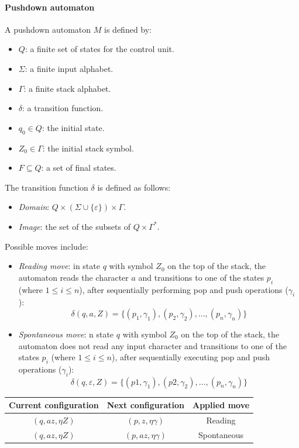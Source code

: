 \paragraph*{Pushdown automaton}
A pushdown automaton $M$ is defined by:
\begin{itemize}
    \item $Q$: a finite set of states for the control unit.
    \item $\Sigma$: a finite input alphabet.
    \item $\Gamma$: a finite stack alphabet.
    \item $\delta$: a transition function.
    \item $q_0 \in Q$: the initial state.
    \item $Z_0 \in \Gamma$: the initial stack symbol.
    \item $F \subseteq Q$: a set of final states.
\end{itemize}
The transition function $\delta$ is defined as follows:
\begin{itemize}
    \item \textit{Domain}: $Q \times \left(\Sigma \cup \{\varepsilon\}\right) \times \Gamma$. 
    \item \textit{Image}: the set of the subsets of $Q \times \Gamma^{*}$. 
\end{itemize}
Possible moves include:
\begin{itemize}
    \item \textit{Reading move}: in state $q$ with symbol $Z_0$ on the top of the stack, the automaton reads the character $a$ and transitions to one of the states $p_i$ (where $1 \leq i \leq n$), after sequentially performing pop and push operations ($\gamma_i$): 
        \[\delta(q,a,Z)=\{(p_1,\gamma_1), (p_2,\gamma_2),\dots,(p_n,\gamma_n)\}\]
    \item \textit{Spontaneous move}: n state $q$ with symbol $Z_0$ on the top of the stack, the automaton does not read any input character and transitions to one of the states $p_i$ (where $1 \leq i \leq n$), after sequentially executing pop and push operations ($\gamma_i$):
        \[\delta(q,\varepsilon,Z)=\{(p1,\gamma_1), (p2,\gamma_2),\dots,(p_n,\gamma_n)\}\]
\end{itemize}
\begin{table}[H]
    \centering
    \begin{tabular}{ccc}
    \hline
    \textbf{Current configuration} & \textbf{Next configuration} & \textbf{Applied move} \\ \hline
    $(q,az,\eta Z)$                & $(p,z,\eta\gamma)$          & Reading               \\
    $(q,az,\eta Z)$                & $(p,az,\eta\gamma)$         & Spontaneous           \\ \hline
    \end{tabular}
\end{table}

